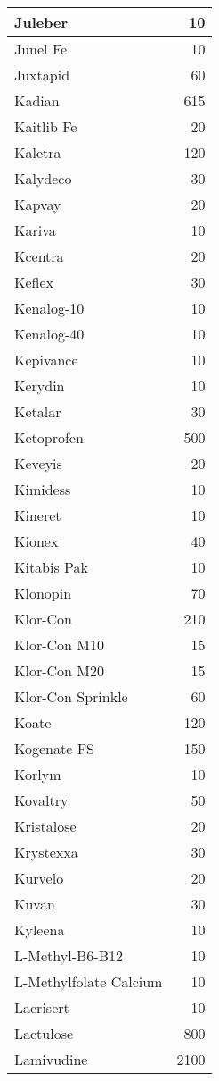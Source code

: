 \documentclass[
]{article}
\begin{document}
\begin{table}
\begin{tabular}[t]{l|r}
\hline
Juleber & 10\\
\hline
Junel Fe & 10\\
\hline
Juxtapid & 60\\
\hline
Kadian & 615\\
\hline
Kaitlib Fe & 20\\
\hline
Kaletra & 120\\
\hline
Kalydeco & 30\\
\hline
Kapvay & 20\\
\hline
Kariva & 10\\
\hline
Kcentra & 20\\
\hline
Keflex & 30\\
\hline
Kenalog-10 & 10\\
\hline
Kenalog-40 & 10\\
\hline
Kepivance & 10\\
\hline
Kerydin & 10\\
\hline
Ketalar & 30\\
\hline
Ketoprofen & 500\\
\hline
Keveyis & 20\\
\hline
Kimidess & 10\\
\hline
Kineret & 10\\
\hline
Kionex & 40\\
\hline
Kitabis Pak & 10\\
\hline
Klonopin & 70\\
\hline
Klor-Con & 210\\
\hline
Klor-Con M10 & 15\\
\hline
Klor-Con M20 & 15\\
\hline
Klor-Con Sprinkle & 60\\
\hline
Koate & 120\\
\hline
Kogenate FS & 150\\
\hline
Korlym & 10\\
\hline
Kovaltry & 50\\
\hline
Kristalose & 20\\
\hline
Krystexxa & 30\\
\hline
Kurvelo & 20\\
\hline
Kuvan & 30\\
\hline
Kyleena & 10\\
\hline
L-Methyl-B6-B12 & 10\\
\hline
L-Methylfolate Calcium & 10\\
\hline
Lacrisert & 10\\
\hline
Lactulose & 800\\
\hline
Lamivudine & 2100\\

\end{tabular}
\end{table}
\end{document}
